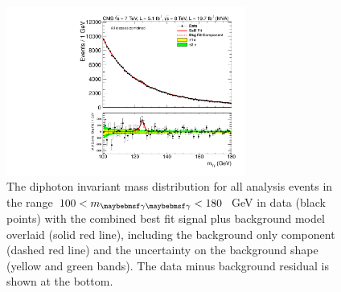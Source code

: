 \begin{figure}
  \includegraphics[width=0.7\textwidth]{results/plots/mgg_mva_fullrange_combcat78TeV_unweighted.pdf}
  \caption[The unweighted diphoton invariant mass distribution for all analysis events in data with the combined best fit signal plus background model overlaid]{The diphoton invariant mass distribution for all analysis events in the range $100<\mgg<180$~GeV in data (black points) with the combined best fit signal plus background model overlaid (solid red line), including the background only component (dashed red line) and the uncertainty on the background shape (yellow and green bands). The data minus background residual is shown at the bottom.}
  \label{fig:sbfit_unw}
\end{figure}

